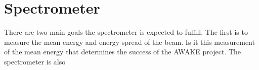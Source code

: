 
\section{Spectrometer}
\label{sec:spectrometer}

There are two main goals the spectrometer is expected to fulfill. The first is
to measure the mean energy and energy spread of the beam. Is it this measurement
of the mean energy that determines the success of the AWAKE project.
The spectrometer is also 

